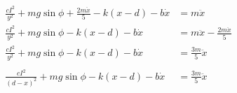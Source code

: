     \begin{align}
        \frac{cI^2}{y^2} + mg \sin{\phi} + \frac{2m \ddot{x}}{5} - k(x - d) - b \dot{x} &= m \ddot{x} \nonumber \\
        \frac{cI^2}{y^2} + mg \sin{\phi} - k(x -d) - b \dot{x} &= m \ddot{x} - \frac{2m \ddot{x}}{5} \nonumber \\
        \frac{cI^2}{y^2} + mg \sin{\phi} - k(x -d) - b \dot{x} &= \frac{3m}{5} \ddot{x} \nonumber \\
        \nonumber \\
        \frac{cI^2}{(d - x)^2} + mg \sin{\phi} - k(x -d) - b \dot{x} &= \frac{3m}{5} \ddot{x}
    \end{align}
    